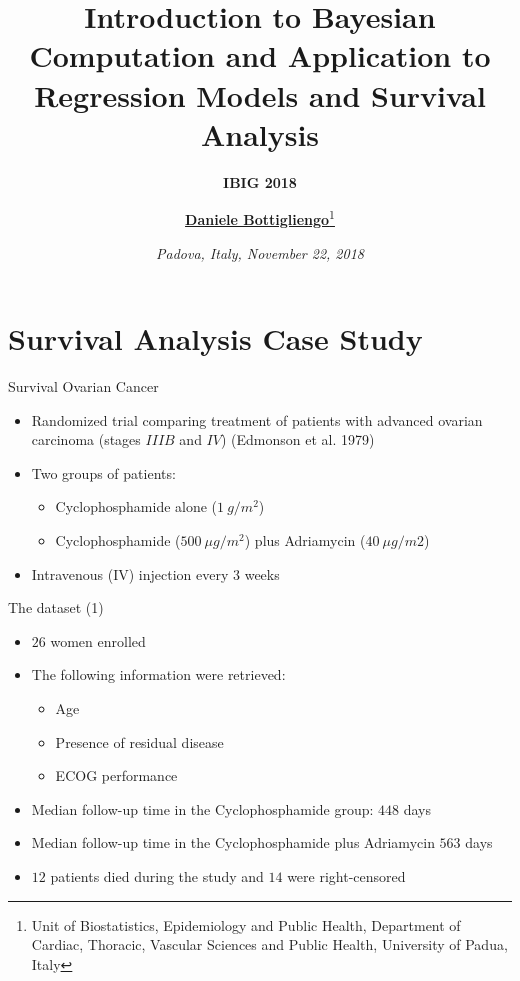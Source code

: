 \documentclass[ignorenonframetext,a4paper]{beamer}
\title{\Large\textbf{Introduction to Bayesian Computation and Application to Regression Models and Survival Analysis}}
\subtitle{\large\textbf{\textrm{IBIG 2018}}}
\author{\centering\underline{\textbf{Daniele Bottigliengo}}\thanks{\tiny Unit of Biostatistics, Epidemiology and Public Health, Department of \newline Cardiac, Thoracic, Vascular Sciences and Public Health, University of Padua, Italy}}
\date{\centering\emph{Padova, Italy, November 22, 2018}}
\begin{document}
\frame{\titlepage}

\section{Survival Analysis Case
Study}\label{survival-analysis-case-study}

\begin{frame}{Survival Ovarian Cancer}

\begin{itemize}
\item
  Randomized trial comparing treatment of patients with advanced ovarian
  carcinoma (stages \(IIIB\) and \(IV\)) (Edmonson et al. 1979)
\item
  Two groups of patients:

  \begin{itemize}
  \item{Cyclophosphamide alone ($1 \> g/m^{2}$)}
  \item{Cyclophosphamide ($500 \> \mu g/m^{2}$) plus Adriamycin 
      ($40 \> \mu g/m2$)}
    \end{itemize}
\item
  Intravenous (IV) injection every \(3\) weeks
\end{itemize}

\end{frame}

\begin{frame}{The dataset (1)}

\begin{itemize}
\setlength\itemsep{1em}
  \item{$26$ women enrolled}
  \item{The following information were retrieved:}
  \begin{itemize}
    \item{Age}
    \item{Presence of residual disease}
    \item{ECOG performance}
  \end{itemize}
\item{Median follow-up time in the Cyclophosphamide group: 
      $448$ days}
\item{Median follow-up time in the Cyclophosphamide plus 
      Adriamycin $563$ days}  
\item{$12$ patients died during the study and $14$ were right-censored}
\end{itemize}

\end{frame}
\end{document}

